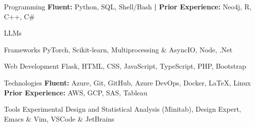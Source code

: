 

\begin{cvskills}


\cvskill
    {Programming} %
        {\textbf{Fluent:} Python, SQL, Shell/Bash \textbf{| Prior Experience:} Neo4j, R, C++, C\#} %


\cvskill
    {LLMs} %
    {} %


\cvskill
    {Frameworks} %
    {PyTorch, Scikit-learn,  Multiprocessing \& AsyncIO, Node, .Net} %


\cvskill
    {Web Development} %
    {Flask, HTML, CSS, JavaScript, TypeScript, PHP, Bootstrap} %
    

\cvskill
    {Technologies} %
    {\textbf{Fluent:} Azure, Git, GitHub, Azure DevOps, Docker, LaTeX, Linux
    \newline
    \textbf{Prior Experience:} AWS, GCP, SAS, Tableau} %
    


\cvskill
    {Tools}
    {Experimental Design and Statistical Analysis (Minitab), Design Expert, Emacs \& Vim, VSCode \& JetBrains}



\end{cvskills}
